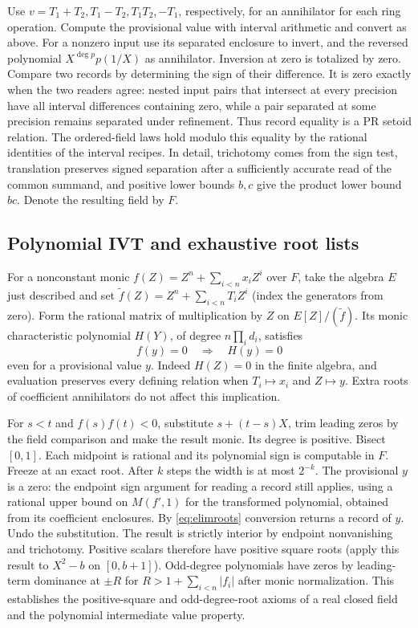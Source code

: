 Use $v=T_1+T_2,T_1-T_2,T_1T_2,-T_1$, respectively, for an annihilator
for each ring operation. Compute the provisional value with interval
arithmetic and convert as above. For a nonzero input use its separated
enclosure to invert, and the reversed polynomial $X^{\deg p}p(1/X)$
as annihilator. Inversion at zero is totalized by zero. Compare two
records by determining the sign of their difference. It is zero exactly
when the two readers agree: nested input pairs that intersect at every
precision have all interval differences containing zero, while a pair
separated at some precision remains separated under refinement. Thus
record equality is a PR setoid relation. The ordered-field laws hold
modulo this equality by the rational identities of the interval recipes.
In detail, trichotomy comes from the sign test, translation preserves
signed separation after a sufficiently accurate read of the common
summand, and positive lower bounds $b,c$ give the product lower bound
$bc$. Denote the resulting field by $F$.

\subsection{Polynomial IVT and exhaustive root lists}
For a nonconstant monic $f(Z)=Z^n+\sum_{i<n}x_i Z^i$ over $F$, take
the algebra $E$ just described and set
$\widetilde f(Z)=Z^n+\sum_{i<n}T_iZ^i$ (index the generators from zero).
Form the rational matrix of multiplication by $Z$ on
$E[Z]/(\widetilde f)$. Its monic characteristic polynomial $H(Y)$,
of degree $n\prod_i d_i$, satisfies
\begin{equation}
 f(y)=0\quad\Longrightarrow\quad H(y)=0
 \label{eq:elimroots}
\end{equation}
even for a provisional value $y$. Indeed $H(Z)=0$ in the finite
algebra, and evaluation preserves every defining relation when
$T_i\mapsto x_i$ and $Z\mapsto y$. Extra roots of coefficient
annihilators do not affect this implication.

For $s<t$ and $f(s)f(t)<0$, substitute $s+(t-s)X$, trim leading
zeros by the field comparison and make the result monic. Its degree
is positive. Bisect $[0,1]$. Each midpoint is rational and its polynomial
sign is computable in $F$. Freeze at an exact root. After $k$ steps the
width is at most $2^{-k}$. The provisional $y$ is a zero: the endpoint
sign argument for reading a record still applies, using a rational
upper bound on $M(f',1)$ for the transformed polynomial, obtained from
its coefficient enclosures. By \eqref{eq:elimroots} conversion returns
a record of $y$. Undo the substitution. The result is strictly interior
by endpoint nonvanishing and trichotomy. Positive scalars therefore
have positive square roots (apply this result to $X^2-b$ on $[0,b+1]$).
Odd-degree polynomials have zeros by leading-term dominance at
$\pm R$ for $R>1+\sum_{i<n}|f_i|$ after monic normalization. This
establishes the positive-square and odd-degree-root axioms of a real
closed field and the polynomial intermediate value property.

